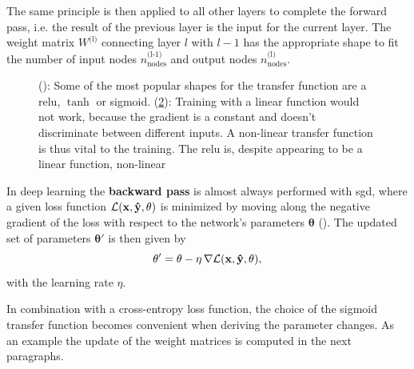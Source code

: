 The same principle is then applied to all other layers to complete the forward pass, i.e. the result of the previous layer is the input for the current layer. The weight matrix $W^{\text{(l)}}$ connecting layer $l$ with $l-1$ has the appropriate shape to fit the number of input nodes $n^{\text{(l-1)}}_\text{nodes}$ and output nodes $n^{\text{(l)}}_\text{nodes}$.

\begin{figure}
	\begin{subfigure}[c]{0.5\textwidth}
		\centering
		\caption{}
		\label{dltransfer}
	\end{subfigure}
	\begin{subfigure}[c]{0.5\textwidth}
		\centering
		\caption{}
		\label{dltransfergradient}
	\end{subfigure}
	\caption[]{(): Some of the most popular shapes for the transfer function are a \gls{relu}, $\tanh$ or sigmoid. (\ref{dltransfergradient}): Training with a linear function would not work, because the gradient is a constant and doesn't discriminate between different inputs. A non-linear transfer function is thus vital to the training. The \gls{relu} is, despite appearing to be a linear function, non-linear}
	\label{deeplearning_activation_functions}
\end{figure}

In deep learning the \textbf{backward pass} is almost always performed with \gls{sgd}, where a given loss function $\mathcal{L}(\mathbf{\mathbf{x}, \hat{y}, \mathbf{\theta}})$ is minimized by moving along the negative gradient of the loss with respect to the network's parameters $\mathbf{\theta}$ (\cite{Goodfellow-et-al-2016}). The updated set  of parameters $\mathbf{\theta}'$ is then given by
\begin{equation}
\mathbf{\theta'} = \mathbf{\theta} - \eta \, \nabla\mathcal{L}(\mathbf{\mathbf{x}, \hat{y}, \mathbf{\theta}}),
\label{stochasticgradientdescent}
\end{equation}
with the learning rate $\eta$. 

In combination with a cross-entropy loss function, the choice of the sigmoid transfer function becomes convenient when deriving the parameter changes. As an example the update of the weight matrices is computed in the next paragraphs.

